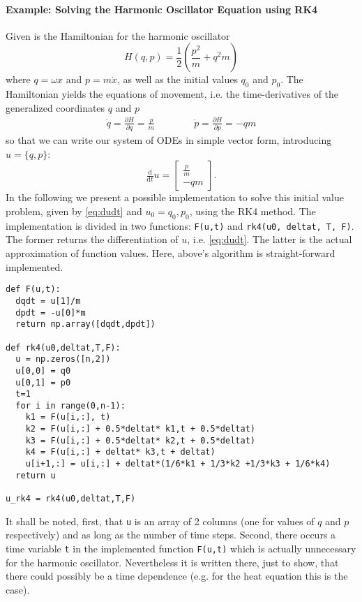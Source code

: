 \paragraph{Example: Solving the Harmonic Oscillator Equation using RK4}
Given is the Hamiltonian for the harmonic oscillator
\begin{equation}
  H(q,p) = \frac{1}{2} \left(\frac{p^2}{m} + q^2m \right)
\end{equation}
where $q = \omega x$ and $p = m \dot{x}$, as well as the initial values $q_0$ and $p_0$. The Hamiltonian yields the equations of movement, i.e. the time-derivatives of the generalized coordinates $q$ and $p$
\begin{align}
  \dot{q} = \frac{\partial H}{\partial q} = \frac{p}{m} \qquad \qquad
  \dot{p} = \frac{\partial H}{\partial p} = -q m
\end{align}
so that we can write our system of ODEs in simple vector form, introducing $u = \{q,p\}$:
\begin{equation}
  \tfrac{\mathrm{d}}{\mathrm{d}t} u =
  \begin{bmatrix} \frac{p}{m} \\ - q m
  \end{bmatrix}.
  \label{eq:dudt}
\end{equation}
In the following we present a possible implementation to solve this initial value problem, given by \ref{eq:dudt} and $u_0 = {q_0, p_0}$, using the RK4 method.
The implementation is divided in two functions: \lstinline{F(u,t)} and \lstinline{rk4(u0, deltat, T, F)}. The former returns the differentiation of $u$, i.e. \ref{eq:dudt}. The latter is the actual approximation of function values. Here, above's algorithm is straight-forward implemented.
\begin{lstlisting}
def F(u,t):
  dqdt = u[1]/m
  dpdt = -u[0]*m
  return np.array([dqdt,dpdt])

def rk4(u0,deltat,T,F):
  u = np.zeros([n,2])
  u[0,0] = q0
  u[0,1] = p0
  t=1
  for i in range(0,n-1):
    k1 = F(u[i,:], t)
    k2 = F(u[i,:] + 0.5*deltat* k1,t + 0.5*deltat)
    k3 = F(u[i,:] + 0.5*deltat* k2,t + 0.5*deltat)
    k4 = F(u[i,:] + deltat* k3,t + deltat)
    u[i+1,:] = u[i,:] + deltat*(1/6*k1 + 1/3*k2 +1/3*k3 + 1/6*k4)
  return u

u_rk4 = rk4(u0,deltat,T,F)
\end{lstlisting}
It shall be noted, first, that \lstinline{u} is an array of 2 columns (one for values of $q$ and $p$ respectively) and as long as the number of time steps. Second, there occurs a time variable \lstinline{t} in the implemented function \lstinline{F(u,t)} which is actually unnecessary for the harmonic oscillator. Nevertheless it is written there, just to show, that there could possibly be a time dependence (e.g. for the heat equation this is the case).





